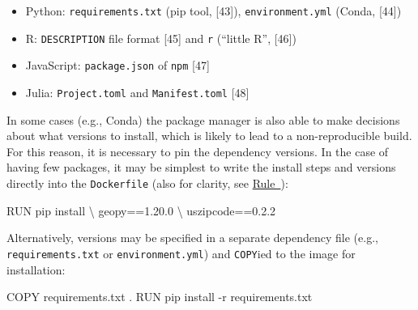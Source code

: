 \documentclass[10pt,letterpaper]{article}
\newenvironment{Shaded}{\begin{snugshade}}{\end{snugshade}}
\newcommand{\ExtensionTok}[1]{#1}
\newcommand{\NormalTok}[1]{#1}
\providecommand{\tightlist}{%
  \setlength{\itemsep}{0pt}\setlength{\parskip}{0pt}}
\begin{document}
\begin{itemize}
\tightlist
\item
  Python: \texttt{requirements.txt} (pip tool, {[}43{]}),
  \texttt{environment.yml} (Conda, {[}44{]})
\item
  R: \texttt{DESCRIPTION} file format {[}45{]} and \texttt{r} (``little
  R'', {[}46{]})
\item
  JavaScript: \texttt{package.json} of \texttt{npm} {[}47{]}
\item
  Julia: \texttt{Project.toml} and \texttt{Manifest.toml} {[}48{]}
\end{itemize}

In some cases (e.g., Conda) the package manager is also able to make
decisions about what versions to install, which is likely to lead to a
non-reproducible build. For this reason, it is necessary to pin the
dependency versions. In the case of having few packages, it may be
simplest to write the install steps and versions directly into the
\texttt{Dockerfile} (also for clarity, see
\hyperref[{rule:clarity}]{Rule~}):

\footnotesize

\begin{Shaded}
\begin{Highlighting}[]
\ExtensionTok{RUN}\NormalTok{ pip install \textbackslash{}}
\NormalTok{  geopy==1.20.0 \textbackslash{}}
\NormalTok{  uszipcode==0.2.2}
\end{Highlighting}
\end{Shaded}

\normalsize

Alternatively, versions may be specified in a separate dependency file
(e.g., \texttt{requirements.txt} or \texttt{environment.yml}) and
\texttt{COPY}ied to the image for installation:

\footnotesize

\begin{Shaded}
\begin{Highlighting}[]
\ExtensionTok{COPY}\NormalTok{ requirements.txt .}
\ExtensionTok{RUN}\NormalTok{ pip install -r requirements.txt}
\end{Highlighting}
\end{Shaded}

\normalsize
\end{document}
